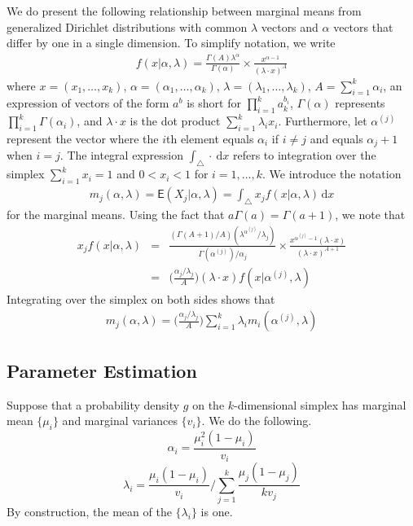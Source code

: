 \documentclass[ba]{imsart}
\numberwithin{equation}{section}
\theoremstyle{plain}
\begin{document}
We do present the following relationship between marginal means from generalized Dirichlet distributions with common $\lambda$ vectors and $\alpha$ vectors that differ by one in a single dimension.
To simplify notation,
we write
\begin{align*}
f(x | \alpha,\lambda) = 
\frac{\Gamma(A)\lambda^\alpha}{\Gamma(\alpha)} \times \frac{x^{\alpha-1}}{(\lambda \cdot x)^A}
\end{align*}
where $x=(x_1,\ldots,x_k)$,
$\alpha=(\alpha_1,\ldots,\alpha_k)$,
$\lambda=(\lambda_1,\ldots,\lambda_k)$,
$A = \sum_{i=1}^k \alpha_i$,
an expression of vectors of the form $a^b$
is short for $\prod_{i=1}^k a_k^{b_i}$,
$\Gamma(\alpha)$ represents $\prod_{i=1}^k \Gamma(\alpha_i)$,
and $\lambda \cdot x$ is the dot product $\sum_{i=1}^k \lambda_i x_i$.
Furthermore,
let $\alpha^{(j)}$ represent the vector
where the $i$th element equals $\alpha_i$ if $i \neq j$ and equals $\alpha_j + 1$
when $i=j$.
The integral expression $\int_{\triangle} \cdot\ \mathrm{d}x$
refers to integration over the simplex $\sum_{i=1}^k x_i=1$ and $0 < x_i < 1$ for $i=1,\ldots,k$.
We introduce the notation
\begin{align*}
m_j(\alpha,\lambda) = \mathsf{E}(X_j | \alpha,\lambda) = \int_{\triangle} x_j f(x|\alpha,\lambda) \, \mathrm{d}x
\end{align*}
for the marginal means.
Using the fact that $a\Gamma(a) = \Gamma(a+1)$,
we note that
\begin{eqnarray*}
x_j f(x | \alpha,\lambda) & = &
\frac{(\Gamma(A+1)/A)(\lambda^{\alpha^{(j)}}/\lambda_j)}{\Gamma(\alpha^{(j)})/\alpha_j} \times \frac{x^{\alpha^{(j)}-1}(\lambda \cdot x)}{(\lambda \cdot x)^{A+1}} \\
& = & \bigg(\frac{\alpha_j/\lambda_j}{A}\bigg) (\lambda \cdot x) f(x | \alpha^{(j)},\lambda)
\end{eqnarray*}
Integrating over the simplex on both sides shows that
\begin{align*}
m_j(\alpha,\lambda) = \bigg(\frac{\alpha_j/\lambda_j}{A}\bigg) \sum_{i=1}^k \lambda_i m_i(\alpha^{(j)},\lambda)
\end{align*}


\subsection{Parameter Estimation}

Suppose that a probability density $g$ on the $k$-dimensional simplex
has marginal mean $\{\mu_i\}$ and marginal variances $\{v_i\}$.  We do
the following.
$$
\alpha_i = \frac{\mu_i^2(1-\mu_i)}{v_i}
$$
$$
\lambda_i = \frac{\mu_i(1-\mu_i)}{v_i} \Bigg/ \sum_{j=1}^k
\frac{\mu_j(1-\mu_j)}{kv_j}
$$
By construction, the mean of the $\{\lambda_i\}$ is one.
\end{document}
